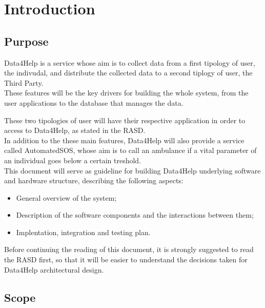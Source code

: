 
\chapter{Introduction}

\section{Purpose}
Data4Help is a service whose aim is to collect data from a first tipology of user, the indivudal, and distribute the collected data to a second tiplogy of user, the Third Party.\\
These features will be the key drivers for building the whole system, from the user applications to the database that manages the data.

These two tipologies of user will have their respective application in order to access to Data4Help, as stated in the RASD. 
\\
In addition to the these main features, Data4Help will also provide a service called AutomatedSOS, whose aim is to call an ambulance if a vital parameter of an individual goes below a certain treshold.
\\
This document will serve as guideline for building Data4Help underlying software and hardware structure, describing the following aspects:
\begin{itemize}
\item General overview of the system;
\item Description of the software components and the interactions between them;
\item Implentation, integration and testing plan.
\end{itemize}

Before continuing the reading of this document, it is strongly suggested to read the RASD first, so that it will be easier to understand the decisions taken for Data4Help architectural design.


\section{Scope}

